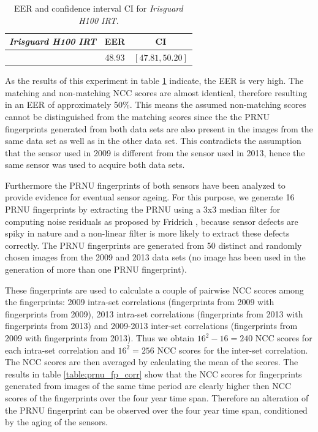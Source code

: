 \documentclass[10pt,twocolumn,letterpaper]{article}
\begin{document}
  \begin{table}[hbt] 
   \begin{center}
	\begin{tabular}{ c | c | c}
		  \emph{Irisguard H100 IRT} & EER & CI \\ 
		  \hline
		   [\%] &  48.93 & $[47.81 , 50.20]$
	\end{tabular}
   \end{center}
     \caption{EER and confidence interval CI for \emph{Irisguard H100 IRT}.}
\label{table:sensor_identification}
 \end{table}

As the results of this experiment in table \ref{table:sensor_identification} indicate, the EER is very high. The matching and non-matching NCC scores are almost identical, therefore resulting in an EER of approximately 50\%. This means the assumed non-matching scores cannot be distinguished from the matching scores since the the PRNU fingerprints generated from both data sets are also present in the images from the same data set as well as in the other data set. This contradicts the assumption that the sensor used in 2009 is different from the sensor used in 2013, hence the same sensor was used to acquire both data sets.

%

Furthermore the PRNU fingerprints of both sensors have been analyzed to provide evidence for eventual sensor ageing. For this purpose, we generate 16 PRNU fingerprints  by extracting the PRNU using a 3x3 median filter for computing noise residuals as proposed by Fridrich \cite{fridrich}, because sensor defects are spiky in nature and a non-linear filter is more likely to extract these defects correctly. The PRNU fingerprints are generated from 50 distinct and randomly chosen images from the 2009 and 2013 data sets (no image has been used in the generation of more than one PRNU fingerprint). 

These fingerprints are used to calculate a couple of pairwise NCC scores among the fingerprints: 2009 intra-set correlations (fingerprints from 2009 with fingerprints from 2009), 2013 intra-set correlations (fingerprints from 2013 with fingerprints from 2013) and 2009-2013 inter-set correlations (fingerprints from 2009 with fingerprints from 2013). Thus we obtain $16^{2}-16 = 240$ NCC scores for each intra-set correlation and $16^2 = 256$ NCC scores for the inter-set correlation. The NCC scores are then averaged by calculating the mean of the scores.
The results in table \ref{table:prnu_fp_corr} show that the NCC scores for fingerprints generated from images of the same time period are clearly higher then NCC scores of the fingerprints over the four year time span. Therefore an alteration of the PRNU fingerprint can be observed over the four year time span, conditioned by the aging of the sensors.
 
\end{document}
